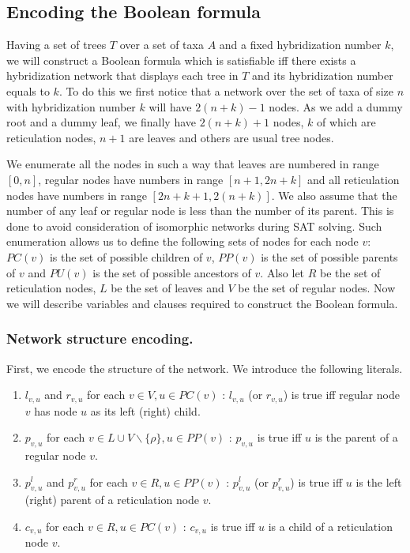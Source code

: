 \documentclass[runningheads, envcountsame, a4paper]{llncs}
\begin{document}
\subsection{Encoding the Boolean formula}

Having a set of trees $T$ over a set of taxa $A$ and a fixed hybridization number $k$, we will construct a Boolean formula 
which is satisfiable iff there exists a hybridization network that displays each tree in $T$ and its hybridization 
number equals to $k$. To do this we first notice that a network over the set of taxa of size $n$ with hybridization number 
$k$ will have $2 (n + k) - 1$ nodes. As we add a dummy root and a dummy leaf, we finally have $2 (n + k) + 1$ nodes, 
$k$ of which are reticulation nodes, $n + 1$ are leaves and others are usual tree nodes.

We enumerate all the nodes in such a way 
that leaves are numbered in range $[0,n]$, regular nodes have numbers in range $[n + 1,2n + k]$ and all reticulation nodes have numbers 
in range $[2n + k + 1, 2(n + k)]$. We also assume that the number of any leaf or regular node is less than the number of its parent. This is done to 
avoid consideration of isomorphic networks during SAT solving. Such enumeration allows us to define the following sets of nodes for each node 
$v$: $PC(v)$ is the set of possible children of $v$, $PP(v)$ is the set of possible parents of $v$ and $PU(v)$ is the set of possible ancestors of $v$. Also let $R$ be the set of reticulation nodes, $L$ be the set of leaves and $V$ be the set of regular nodes. 
Now we will describe variables and clauses required to construct the Boolean formula.

\subsubsection{Network structure encoding.} 

First, we encode the structure of the network. We introduce the following literals. 

\begin{enumerate}

\item $l_{v,u}$ and $r_{v,u}$ for each $v \in V, u \in PC(v)$ : 
$l_{v,u}$ (or $r_{v,u}$) is true iff regular node $v$ has node $u$ as its left (right) child.

\item $p_{v,u}$  for each $v \in L \cup V \backslash \{\rho\}, u \in PP(v)$ :
$p_{v,u}$ is true iff $u$ is the parent of a regular node $v$.

\item $p^l_{v,u}$ and $p^r_{v,u}$ for each $v \in R, u \in PP(v)$ :
$p^l_{v,u}$ (or $p^r_{v,u}$) is true iff $u$ is the left (right) parent of a reticulation node $v$.

\item $c_{v,u}$ for each $v \in R, u \in PC(v)$ :
$c_{v,u}$ is true iff $u$ is a child of a reticulation node $v$.

\end{enumerate}
\end{document}
